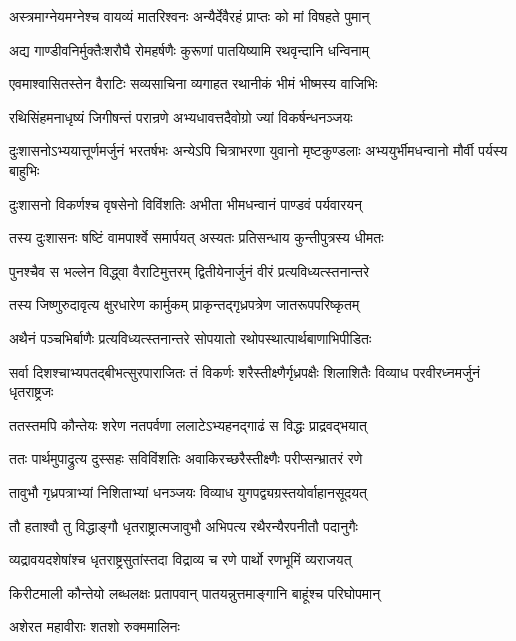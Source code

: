 \twolineshloka
{अस्त्रमाग्नेयमग्नेश्च वायव्यं मातरिश्वनः}
{अन्यैर्देवैरहं प्राप्तः को मां विषहते पुमान्}


\twolineshloka
{अद्य गाण्डीवनिर्मुक्तैःशरौघै रोमहर्षणैः}
{कुरूणां पातयिष्यामि रथवृन्दानि धन्विनाम्}



\twolineshloka
{एवमाश्वासितस्तेन वैराटिः सव्यसाचिना}
{व्यगाहत रथानीकं भीमं भीष्मस्य वाजिभिः}


\twolineshloka
{रथिसिंहमनाधृष्यं जिगीषन्तं परान्रणे}
{अभ्यधावत्तदैवोग्रो ज्यां विकर्षन्धनञ्जयः}


\onelineshloka
{दुःशासनोऽभ्ययात्तूर्णमर्जुनं भरतर्षभः}
\twolineshloka
{अन्येऽपि चित्राभरणा युवानो मृष्टकुण्डलाः}
{अभ्ययुर्भीमधन्वानो मौर्वी पर्यस्य बाहुभिः}


\twolineshloka
{दुःशासनो विकर्णश्च वृषसेनो विविंशतिः}
{अभीता भीमधन्वानं पाण्डवं पर्यवारयन्}


\twolineshloka
{तस्य दुःशासनः षष्टिं वामपार्श्वे समार्पयत्}
{अस्यतः प्रतिसन्धाय कुन्तीपुत्रस्य धीमतः}


\twolineshloka
{पुनश्चैव स भल्लेन विद्ध्वा वैराटिमुत्तरम्}
{द्वितीयेनार्जुनं वीरं प्रत्यविध्यत्स्तनान्तरे}


\twolineshloka
{तस्य जिष्णुरुदावृत्य क्षुरधारेण कार्मुकम्}
{प्राकृन्तद्गृध्रपत्रेण जातरूपपरिष्कृतम्}


\twolineshloka
{अथैनं पञ्चभिर्बाणैः प्रत्यविध्यत्स्तनान्तरे}
{सोपयातो रथोपस्थात्पार्थबाणाभिपीडितः}


\threelineshloka
{सर्वा दिशश्चाभ्यपतद्बीभत्सुरपाराजितः}
{तं विकर्णः शरैस्तीक्ष्णैर्गृध्रपक्षैः शिलाशितैः}
{विव्याध परवीरध्नमर्जुनं धृतराष्ट्रजः}


\twolineshloka
{ततस्तमपि कौन्तेयः शरेण नतपर्वणा}
{ललाटेऽभ्यहनद्गाढं स विद्धः प्राद्रवद्भयात्}


\twolineshloka
{ततः पार्थमुपाद्रुत्य दुस्सहः सविविंशतिः}
{अवाकिरच्छरैस्तीक्ष्णैः परीप्सन्भ्रातरं रणे}


\twolineshloka
{तावुभौ गृध्रपत्राभ्यां निशिताभ्यां धनञ्जयः}
{विव्याध युगपद्व्यग्रस्तयोर्वाहानसूदयत्}


\twolineshloka
{तौ हताश्वौ तु विद्धाङ्गौ धृतराष्ट्रात्मजावुभौ}
{अभिपत्य रथैरन्यैरपनीतौ पदानुगैः}


\twolineshloka
{व्यद्रावयदशेषांश्च धृतराष्ट्रसुतांस्तदा}
{विद्राव्य च रणे पार्थो रणभूमिं व्यराजयत्}


\twolineshloka
{किरीटमाली कौन्तेयो लब्धलक्षः प्रतापवान्}
{पातयन्नुत्तमाङ्गानि बाहूंश्च परिघोपमान्}


\onelineshloka
{अशेरत महावीराः शतशो रुक्ममालिनः}

